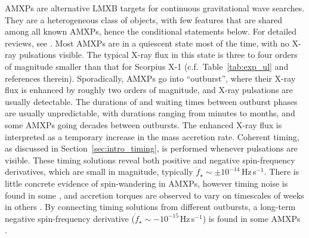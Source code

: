 AMXPs are alternative LMXB targets for continuous gravitational wave searches. They are a heterogeneous class of objects, with few features that are shared among all known AMXPs, hence the conditional statements below. For detailed reviews, see \citet{Marino2019,Patruno2021,DiSalvo2022}. Most AMXPs are in a quiescent state most of the time, with no X-ray pulsations visible. The typical X-ray flux in this state is three to four orders of magnitude smaller than that for Scorpius X-1 (c.f.~Table~\ref{tab:exp_ul} and references therein). Sporadically, AMXPs go into ``outburst'', where their X-ray flux is enhanced by roughly two orders of magnitude, and X-ray pulsations are usually detectable. The durations of and waiting times between outburst phases are usually unpredictable, with durations ranging from minutes to months, and some AMXPs going decades between outbursts. The enhanced X-ray flux is interpreted as a temporary increase in the mass accretion rate. Coherent timing, as discussed in Section~\ref{sec:intro_timing}, is performed whenever pulsations are visible. These timing solutions reveal both positive and negative spin-frequency derivatives, which are small in magnitude, typically $\dot{f}_\star \sim \pm 10^{-14}\,$Hz\,s$^{-1}$. There is little concrete evidence of spin-wandering in AMXPs, however timing noise is found in some \citep{Patruno2009a}, and accretion torques are observed to vary on timescales of weeks in others \citep{Campana2018}. By connecting timing solutions from different outbursts, a long-term negative spin-frequency derivative ($\dot{f}_\star \sim -10^{-15\,}$Hz\,s$^{-1}$) is found in some AMXPs \citep{Papitto2011,Riggio2011,Patruno1808}. 

